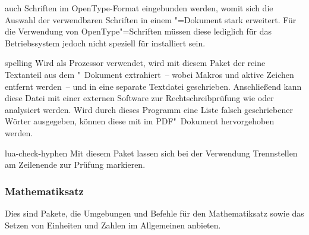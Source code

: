 \begin{packages}
  auch Schriften im OpenType-Format eingebunden werden, womit sich die Auswahl 
  der verwendbaren Schriften in einem "=Dokument stark erweitert. 
  Für die Verwendung von OpenType"=Schriften müssen diese lediglich für das 
  Betriebssystem jedoch nicht speziell für  installiert sein.
\item[spelling]
  Wird  als Prozessor verwendet, wird mit diesem Paket der 
  reine Textanteil aus dem "~Dokument extrahiert~-- wobei Makros 
  und aktive Zeichen entfernt werden~-- und in eine separate Textdatei 
  geschrieben. Anschließend kann diese Datei mit einer externen Software zur 
  Rechtschreibprüfung wie  oder  
  analysiert werden. Wird durch dieses Programm eine Liste falsch geschriebener 
  Wörter ausgegeben, können diese mit  im PDF"~Dokument 
  hervorgehoben werden.
\item[lua-check-hyphen]
  Mit diesem Paket lassen sich bei der Verwendung  
  Trennstellen am Zeilenende zur Prüfung markieren.
\end{packages}

\subsubsection{Mathematiksatz}
Dies sind Pakete, die Umgebungen und Befehle für den Mathematiksatz sowie das 
Setzen von Einheiten und Zahlen im Allgemeinen anbieten.

